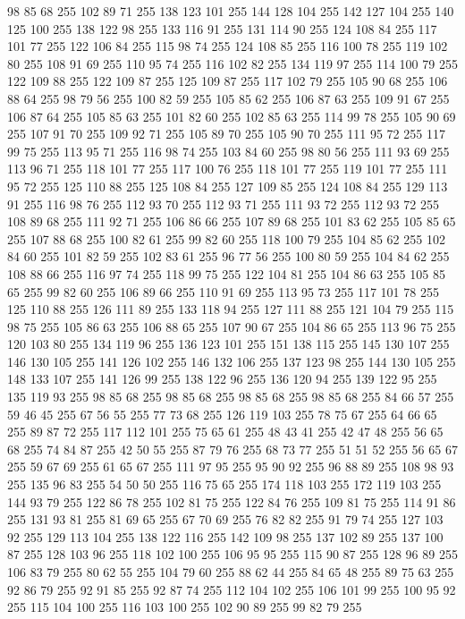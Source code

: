 98 85 68 255 102 89 71 255 138 123 101 255 144 128 104 255 142 127 104 255 140 125 100 255 138 122 98 255 133 116 91 255 131 114 90 255 124 108 84 255 117 101 77 255 122 106 84 255 115 98 74 255 124 108 85 255 116 100 78 255 119 102 80 255 108 91 69 255 110 95 74 255 116 102 82 255 134 119 97 255 114 100 79 255 122 109 88 255 122 109 87 255 125 109 87 255 117 102 79 255 105 90 68 255 106 88 64 255 98 79 56 255 100 82 59 255 105 85 62 255 106 87 63 255 109 91 67 255 106 87 64 255 105 85 63 255 101 82 60 255 102 85 63 255 114 99 78 255 105 90 69 255 107 91 70 255 109 92 71 255 105 89 70 255 105 90 70 255 111 95 72 255 117 99 75 255 113 95 71 255 116 98 74 255 103 84 60 255 98 80 56 255 111 93 69 255 113 96 71 255 118 101 77 255 117 100 76 255 118 101 77 255 119 101 77 255 111 95 72 255 125 110 88 255 125 108 84 255 127 109 85 255 124 108 84 255 129 113 91 255 116 98 76 255 112 93 70 255 112 93 71 255 111 93 72 255
112 93 72 255 108 89 68 255 111 92 71 255 106 86 66 255 107 89 68 255 101 83 62 255 105 85 65 255 107 88 68 255 100 82 61 255 99 82 60 255 118 100 79 255 104 85 62 255 102 84 60 255 101 82 59 255 102 83 61 255 96 77 56 255 100 80 59 255 104 84 62 255 108 88 66 255 116 97 74 255 118 99 75 255 122 104 81 255 104 86 63 255 105 85 65 255 99 82 60 255 106 89 66 255 110 91 69 255 113 95 73 255 117 101 78 255 125 110 88 255 126 111 89 255 133 118 94 255 127 111 88 255 121 104 79 255 115 98 75 255 105 86 63 255 106 88 65 255 107 90 67 255 104 86 65 255 113 96 75 255 120 103 80 255 134 119 96 255 136 123 101 255 151 138 115 255 145 130 107 255 146 130 105 255 141 126 102 255 146 132 106 255 137 123 98 255 144 130 105 255 148 133 107 255 141 126 99 255 138 122 96 255 136 120 94 255 139 122 95 255 135 119 93 255 98 85 68 255 98 85 68 255 98 85 68 255 98 85 68 255 84 66 57 255 59 46 45 255 67 56 55 255 77 73 68 255
126 119 103 255 78 75 67 255 64 66 65 255 89 87 72 255 117 112 101 255 75 65 61 255 48 43 41 255 42 47 48 255 56 65 68 255 74 84 87 255 42 50 55 255 87 79 76 255 68 73 77 255 51 51 52 255 56 65 67 255 59 67 69 255 61 65 67 255 111 97 95 255 95 90 92 255 96 88 89 255 108 98 93 255 135 96 83 255 54 50 50 255 116 75 65 255 174 118 103 255 172 119 103 255 144 93 79 255 122 86 78 255 102 81 75 255 122 84 76 255 109 81 75 255 114 91 86 255 131 93 81 255 81 69 65 255 67 70 69 255 76 82 82 255 91 79 74 255 127 103 92 255 129 113 104 255 138 122 116 255 142 109 98 255 137 102 89 255 137 100 87 255 128 103 96 255 118 102 100 255 106 95 95 255 115 90 87 255 128 96 89 255 106 83 79 255 80 62 55 255 104 79 60 255 88 62 44 255 84 65 48 255 89 75 63 255 92 86 79 255 92 91 85 255 92 87 74 255 112 104 102 255 106 101 99 255 100 95 92 255 115 104 100 255 116 103 100 255 102 90 89 255 99 82 79 255
